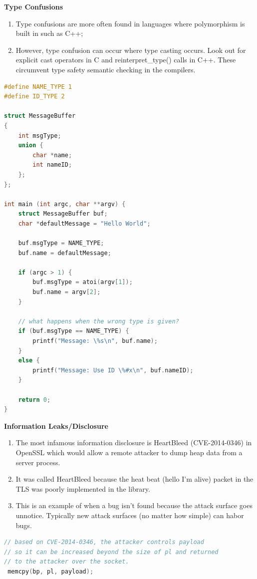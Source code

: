 \documentclass[12pt]{Training}
\begin{document}
\textbf{Type Confusions}
\begin{enumerate}
    \item Type confusions are more often found in languages where polymorphism is built in such as C++;
    \item However, type confusion can occur where type casting occurs. Look out for explicit cast operators in C and reinterpret\_type() calls in C++. These circumvent type safety semantic checking in the compilers.
\end{enumerate}
\begin{sectionbox}
\begin{lstlisting}[language=C, caption={Type Confusion}]
#define NAME_TYPE 1
#define ID_TYPE 2

struct MessageBuffer
{
    int msgType;
    union {
        char *name;
        int nameID;
    };
};

int main (int argc, char **argv) {
    struct MessageBuffer buf;
    char *defaultMessage = "Hello World";

    buf.msgType = NAME_TYPE;
    buf.name = defaultMessage;

    if (argc > 1) {
        buf.msgType = atoi(argv[1]);
        buf.name = argv[2];
    }

    // what happens when the wrong type is given?
    if (buf.msgType == NAME_TYPE) {
        printf("Message: \%s\n", buf.name);
    }
    else {
        printf("Message: Use ID \%#x\n", buf.nameID);
    }

    return 0;
}
\end{lstlisting}
\end{sectionbox}

\textbf{Information Leaks/Disclosure}
\begin{enumerate}
    \item The most infamous information disclosure is HeartBleed (CVE-2014-0346) in OpenSSL which would allow a remote attacker to dump heap data from a server process.
    \item It was called HeartBleed because the heat beat (hello I'm alive) packet in the TLS was poorly implemented in the library.
    \item This is an example of when a bug isn't found because the attack surface goes unnotice. Typically new attack surfaces (no matter how simple) can habor bugs.
\end{enumerate}
\begin{sectionbox}
\begin{lstlisting}[language=C, caption={Info Leak}]
// based on CVE-2014-0346, the attacker controls payload
// so it can be increased beyond the size of pl and returned
// to the attacker over the socket.
 memcpy(bp, pl, payload);
\end{lstlisting}
\end{sectionbox}
\end{document}

